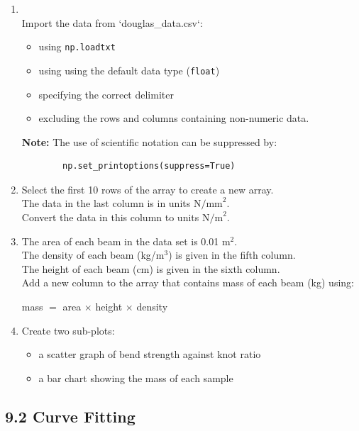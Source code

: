 \documentclass[11pt]{report}
\begin{document}
\begin{enumerate}[label=(\Alph*)]
    
    \item   \\
    Import the data from `douglas\_data.csv`:
    \begin{itemize}
        \item using {\tt np.loadtxt}
        \item using using the default data type ({\tt float})
        \item specifying the correct delimiter
        \item excluding the rows and columns containing non-numeric data.
    \end{itemize}
    {\bf Note:} The use of scientific notation can be suppressed by:
    \begin{verbatim}
        np.set_printoptions(suppress=True)
    \end{verbatim}
    
    \item Select the first 10 rows of the array to create a new array.\\
    The data in the last column is in units $\mathrm{N/mm}^2$.\\
    Convert the data in this column to units $\mathrm{N/m}^2$.\\

    \item The area of each beam in the data set is 0.01 $\mathrm{m^2}$.\\
    The density of each beam (kg/m$^3$) is given in the fifth column. \\
    The height of each beam (cm) is given in the sixth column. \\
    Add a new column to the array that contains mass of each beam (kg) using:

    mass $=$ area $\times$ height $\times$ density
    
    \item Create two sub-plots:
    \begin{itemize}
        \item a scatter graph of  bend strength against knot ratio 
        \item a bar chart showing the mass of each sample
    \end{itemize}

\end{enumerate}

\subsection*{\Large 9.2 Curve Fitting}
\end{document}
